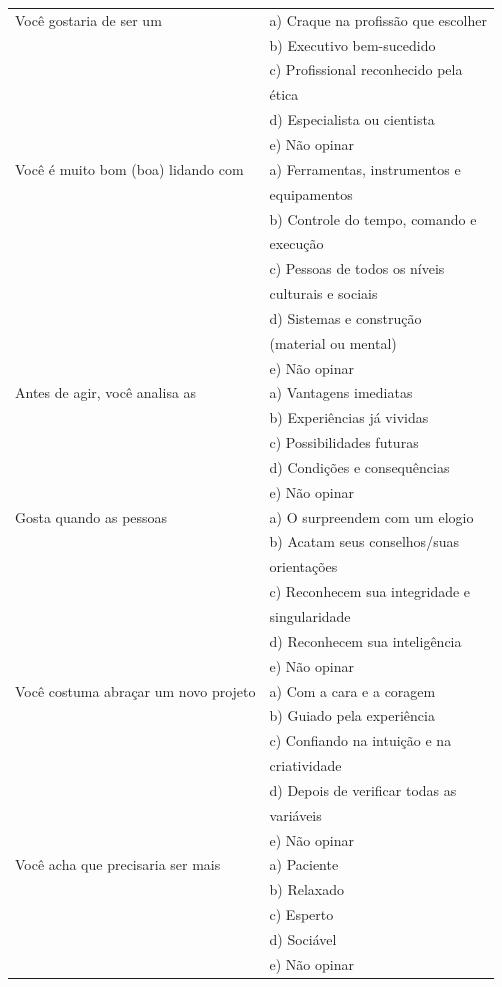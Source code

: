 \documentclass[
	12pt,				%
    oneside,			%
	a4paper,			%
	english,			%
	french,				%
	spanish,			%
	brazil,				%
	]{abntex2}
\begin{document}
\begin{apendicesenv}
\begin{center}
\begin{longtable}{l|l}
    \\ \hline
    Você gostaria de ser um & a) Craque na profissão que escolher\\ & b) Executivo bem-sucedido\\ & c) Profissional reconhecido pela \\ & ética\\ & d) Especialista ou cientista\\ & e) Não opinar
    \\ \hline
    Você é muito bom (boa) lidando com & a) Ferramentas, instrumentos e \\ &equipamentos\\ & b) Controle do tempo, comando e \\ &execução\\ & c) Pessoas de todos os níveis \\ & culturais e sociais\\ & d) Sistemas e construção \\ & (material ou mental)\\ & e) Não opinar
    \\ \hline
    Antes de agir, você analisa as & a) Vantagens imediatas\\ & b) Experiências já vividas\\ & c) Possibilidades futuras\\ & d) Condições e consequências\\ & e) Não opinar
    \\ \hline
    Gosta quando as pessoas & a) O surpreendem com um elogio\\ & b) Acatam seus conselhos/suas \\ & orientações\\ & c) Reconhecem sua integridade e\\ & singularidade\\ & d) Reconhecem sua inteligência\\ & e) Não opinar
    \\ \hline
    Você costuma abraçar um novo projeto & a) Com a cara e a coragem\\ & b) Guiado pela experiência\\ & c) Confiando na intuição e na \\ & criatividade\\ & d) Depois de verificar todas as \\ & variáveis\\ & e) Não opinar
    \\ \hline
    Você acha que precisaria ser mais & a) Paciente\\ & b) Relaxado\\ & c) Esperto\\ & d) Sociável\\ & e) Não opinar                                \\ \hline

\end{longtable}
\end{center}
\end{apendicesenv}
\end{document}
